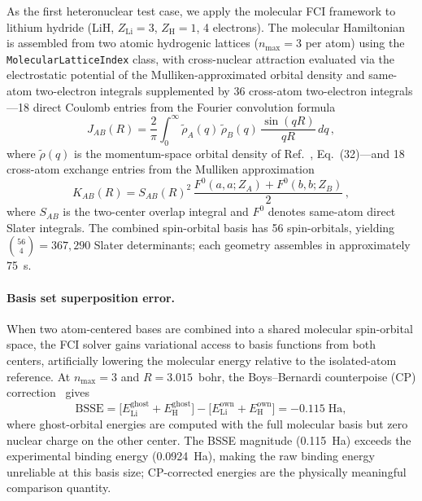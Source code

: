 \documentclass[aps,pra,twocolumn,superscriptaddress,longbibliography,floatfix]{revtex4-2}
\begin{document}
As the first heteronuclear test case, we apply the molecular FCI framework
to lithium hydride (LiH, $Z_{\text{Li}}=3$, $Z_{\text{H}}=1$, 4 electrons).
The molecular Hamiltonian is assembled from two atomic hydrogenic lattices
($n_{\max}=3$ per atom) using the \texttt{MolecularLatticeIndex} class,
with cross-nuclear attraction evaluated via the electrostatic potential of
the Mulliken-approximated orbital density and same-atom two-electron
integrals supplemented by 36 cross-atom two-electron integrals---18
direct Coulomb entries from the Fourier convolution formula
\begin{equation}
J_{AB}(R) = \frac{2}{\pi} \int_0^\infty
\tilde{\rho}_A(q)\,\tilde{\rho}_B(q)\,
\frac{\sin(qR)}{qR}\,dq\,,
\label{eq:jab}
\end{equation}
where $\tilde{\rho}(q)$ is the momentum-space orbital density of
Ref.~\cite{Loutey2026c}, Eq.~(32)---and 18 cross-atom exchange entries
from the Mulliken approximation
\begin{equation}
K_{AB}(R) = S_{AB}(R)^2 \,\frac{F^0(a,a;Z_A) + F^0(b,b;Z_B)}{2}\,,
\label{eq:kab}
\end{equation}
where $S_{AB}$ is the two-center overlap integral and $F^0$ denotes
same-atom direct Slater integrals.
The combined spin-orbital basis has 56 spin-orbitals, yielding
$\binom{56}{4} = 367{,}290$ Slater determinants; each geometry assembles
in approximately 75~s.

\paragraph{Basis set superposition error.}
When two atom-centered bases are combined into a shared molecular
spin-orbital space, the FCI solver gains variational access to basis
functions from both centers, artificially lowering the molecular energy
relative to the isolated-atom reference. At $n_{\max}=3$ and
$R = 3.015$~bohr, the Boys--Bernardi counterpoise (CP)
correction~\cite{Boys1970} gives
\begin{equation}
\text{BSSE} = \bigl[E_{\text{Li}}^{\text{ghost}}
+ E_{\text{H}}^{\text{ghost}}\bigr]
- \bigl[E_{\text{Li}}^{\text{own}}
+ E_{\text{H}}^{\text{own}}\bigr]
= -0.115\;\text{Ha},
\label{eq:bsse}
\end{equation}
where ghost-orbital energies are computed with the full molecular basis
but zero nuclear charge on the other center. The BSSE magnitude
(0.115~Ha) exceeds the experimental binding energy (0.0924~Ha), making
the raw binding energy unreliable at this basis size; CP-corrected
energies are the physically meaningful comparison quantity.
\end{document}
